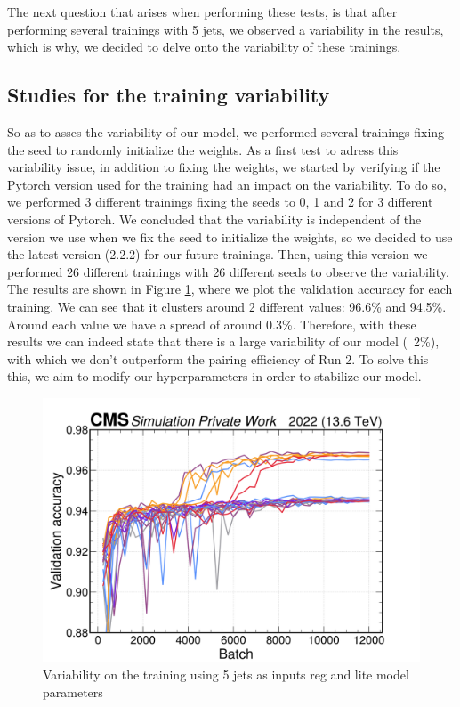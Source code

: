 The next question that arises when performing these tests, is that after performing several trainings with 5 jets, we observed a variability in the results, which is why, we decided to delve onto the variability of these trainings.

\subsection{Studies for the training variability}
So as to asses the variability of our model, we performed several trainings fixing the seed to randomly initialize the weights. As a first test to adress this variability issue, in addition to fixing the weights, we started by verifying if the Pytorch version used for the training had an impact on the variability. To do so, we performed 3 different trainings fixing the seeds to 0, 1 and 2 for 3 different versions of Pytorch. We concluded that the variability is independent of the version we use when we fix the seed to initialize the weights, so we decided to use the latest version (2.2.2) for our future trainings. Then, using this version we performed 26 different trainings with 26 different seeds to observe the variability. The results are shown in Figure \ref{fig: 5j variability}, where we plot the validation accuracy for each training. We can see that it clusters around 2 different values: 96.6\% and 94.5\%. Around each value we have a spread of around 0.3\%. Therefore, with these results we can indeed state that there is a large variability of our model (~2\%), with which we don't outperform the pairing efficiency of Run 2. To solve this this, we aim to modify our hyperparameters in order to stabilize our model.

\begin{figure}[hbt]
    \centering
    \includegraphics[scale=0.1]{Images/6.Improving/Variability Study/5 jets variability study.png}
    \caption{Variability on the training using 5 jets as inputs \pt reg and lite model parameters}
    \label{fig: 5j variability}
\end{figure}

